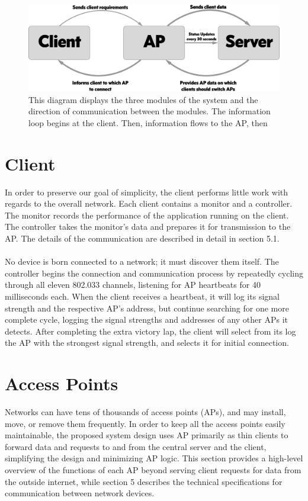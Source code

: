 \documentclass[10pt,journal,compsoc]{IEEEtran}
\begin{document}
        \begin{figure}
            \includegraphics[width=\linewidth]{overviewDiagram.png}
            \caption{This diagram displays the three modules of the system and the direction of communication between the modules. The information loop begins at the client. Then, information flows to the AP, then }
            \label{fig:overview}
        \end{figure}
		
		
		\section{Client}
		In order to preserve our goal of simplicity, the client performs little work with regards to the overall network. Each client contains a monitor and a controller. The monitor records the performance of the application running on the client. The controller takes the monitor's data and prepares it for transmission to the AP. The details of the communication are described in detail in section 5.1.\\
		\\
		No device is born connected to a network; it must discover them itself. The controller begins the connection and communication process by repeatedly cycling through all eleven 802.033 channels, listening for AP heartbeats for 40 milliseconds each. When the client receives a heartbeat, it will log its signal strength and the respective AP’s address, but continue searching for one more complete cycle, logging the signal strengths and addresses of any other APs it detects. After completing the extra victory lap, the client will select from its log the AP with the strongest signal strength, and selects it for initial connection.
		
		\section{Access Points}
		Networks can have tens of thousands of access points (APs), and may install, move, or remove them frequently. In order to keep all the access points easily maintainable, the proposed system design uses AP primarily as thin clients to forward data and requests to and from the central server and the client, simplifying the design and minimizing AP logic. This section provides a high-level overview of the functions of each AP beyond serving client requests for data from the outside internet, while section 5 describes the technical specifications for communication between network devices.
		
\end{document}
